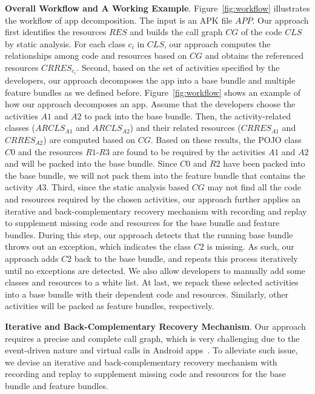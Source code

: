 \noindent\textbf{Overall Workflow and A Working Example}. 
Figure~\ref{fig:workflow} illustrates the workflow of app decomposition. The input is an APK file $APP$.
Our approach first identifies the resources $RES$ and builds the call graph $CG$ of the code $CLS$ by static analysis. 
For each class $c_i$ in $CLS$, our approach computes the relationships among code and resources based on $CG$ and obtains the referenced resources $CRRES_{c_i}$.
Second, based on the set of activities specified by the developers, our approach decomposes the app into a base bundle and multiple feature bundles as we defined before. 
Figure~\ref{fig:workflow} shows an example of how our approach decomposes an app. Assume that the developers choose the activities $A1$ and $A2$ to pack into the base bundle. 
Then, the activity-related classes ($ARCLS_{A1}$ and $ARCLS_{A2}$) and their related resources ($CRRES_{A1}$ and $CRRES_{A2}$) are computed based on $CG$.
Based on these results, the POJO class $C0$ and the resources $R1$-$R3$ are found to be required by the activities $A1$ and $A2$ and will be packed into the base bundle. 
Since $C0$ and $R2$ have been packed into the base bundle, we will not pack them into the feature bundle that contains the activity $A3$.
Third, since the static analysis based $CG$ may not find all the code and resources required by the chosen activities, our approach further applies an iterative and back-complementary recovery mechanism with recording and replay to supplement missing code and resources for the base bundle and feature bundles. 
During this step, our approach detects that the running base bundle throws out an exception, which indicates the class $C2$ is missing. As such, our approach adds $C2$ back to the base bundle, and repeats this process iteratively until no exceptions are detected. We also allow developers to manually add some classes and resources to a white list.
At last, we repack these selected activities into a base bundle with their dependent code and resources. Similarly, other activities will be packed as feature bundles, respectively.


\noindent\textbf{Iterative and Back-Complementary Recovery Mechanism}. Our approach requires a precise and complete call graph, which is very challenging due to the event-driven nature and virtual calls in Android apps~\cite{Wang16PLDI}\cite{Li17IST}\cite{Li16ISTTA}. 
To alleviate such issue, we devise an iterative and back-complementary recovery mechanism with recording and replay to supplement missing code and resources for the base bundle and feature bundles.

